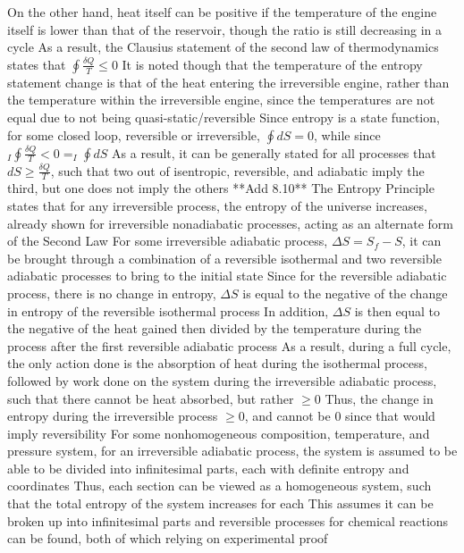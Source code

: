 \documentclass[11 pt, twoside]{article}
\newenvironment{outline*}
{
	\begin{outline}[enumerate]
	}
	{\end{outline}
}
\begin{document}
\begin{outline*}
\3 On the other hand, heat itself can be positive if the temperature of the engine itself is lower than that of the reservoir, though the ratio is still decreasing in a cycle
\2 As a result, the Clausius statement of the second law of thermodynamics states that $\oint \frac{\delta Q}{T} \leq 0$
\3 It is noted though that the temperature of the entropy statement change is that of the heat entering the irreversible engine, rather than the temperature within the irreversible engine, since the temperatures are not equal due to not being quasi-static/reversible
\1 Since entropy is a state function, for some closed loop, reversible or irreversible, $\oint dS = 0$, while since $_I\oint \frac{\delta Q}{T} < 0 = _I\oint dS$
\2 As a result, it can be generally stated for all processes that $dS \geq \frac{\delta Q}{T}$, such that two out of isentropic, reversible, and adiabatic imply the third, but one does not imply the others
\1 **Add 8.10**
\1 The Entropy Principle states that for any irreversible process, the entropy of the universe increases, already shown for irreversible nonadiabatic processes, acting as an alternate form of the Second Law
\2 For some irreversible adiabatic process, $\Delta S = S_f - S$, it can be brought through a combination of a reversible isothermal and two reversible adiabatic processes to bring to the initial state
\3 Since for the reversible adiabatic process, there is no change in entropy, $\Delta S$ is equal to the negative of the change in entropy of the reversible isothermal process
\3 In addition, $\Delta S$ is then equal to the negative of the heat gained then divided by the temperature during the process after the first reversible adiabatic process
\3 As a result, during a full cycle, the only action done is the absorption of heat during the isothermal process, followed by work done on the system during the irreversible adiabatic process, such that there cannot be heat absorbed, but rather $\geq 0$
\3 Thus, the change in entropy during the irreversible process $\geq 0$, and cannot be 0 since that would imply reversibility
\2 For some nonhomogeneous composition, temperature, and pressure system, for an irreversible adiabatic process, the system is assumed to be able to be divided into infinitesimal parts, each with definite entropy and coordinates
\3 Thus, each section can be viewed as a homogeneous system, such that the total entropy of the system increases for each
\3 This assumes it can be broken up into infinitesimal parts and reversible processes for chemical reactions can be found, both of which relying on experimental proof

\end{outline*}
\end{document}
